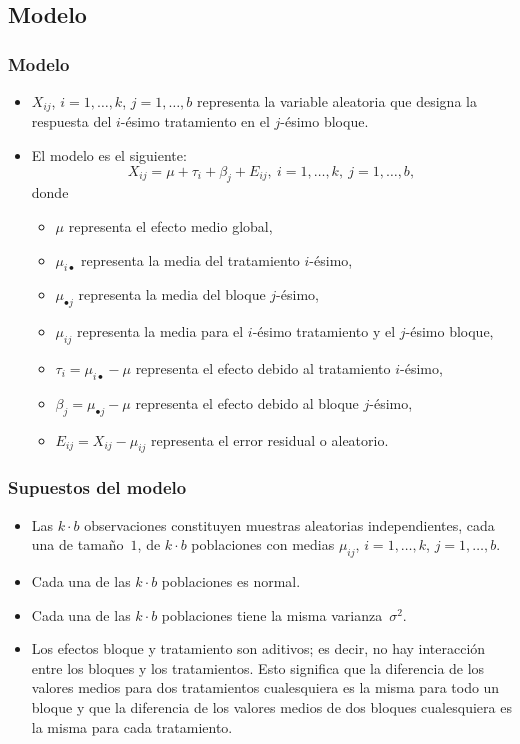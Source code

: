 \subsection{Modelo}
\begin{frame}
\frametitle{Modelo}
\begin{itemize}
\item<2-> $X_{ij}$, $i=1,\ldots,k$, $j=1,\ldots,b$ representa la variable aleatoria que designa la respuesta del $i$-ésimo tratamiento en el $j$-ésimo bloque. 
\item<3-> El modelo es el siguiente:
\[
X_{ij}=\mu + \tau_i + \beta_j + E_{ij}, \ i=1,\ldots,k,\  j=1,\ldots,b,
\]
donde
\begin{itemize}
\item<4-> $\mu$ representa el efecto medio global,
\item<5-> $\mu_{i\bullet}$ representa la media del tratamiento $i$-ésimo,
\item<6-> $\mu_{\bullet j}$ representa la media del bloque $j$-ésimo,
\item<7-> $\mu_{ij}$ representa la media para el $i$-ésimo tratamiento y el $j$-ésimo bloque,
\item<8-> $\tau_{i}=\mu_{i\bullet}-\mu$ representa el efecto debido al tratamiento $i$-ésimo,
\item<9-> $\beta_j = \mu_{\bullet j}-\mu$ representa el efecto debido al bloque $j$-ésimo,
\item<10-> $E_{ij}=X_{ij}-\mu_{ij}$ representa el error residual o aleatorio.
\end{itemize}
\end{itemize}
\end{frame}
\begin{frame}
\frametitle{Supuestos del modelo}
\begin{itemize}
\item<2-> Las $k\cdot b$ observaciones constituyen muestras aleatorias independientes, cada una de tamaño~$1$, de $k\cdot b$ poblaciones con medias $\mu_{ij}$, $i=1,\ldots,k$, $j=1,\ldots,b$.
\item<3-> Cada una de las $k\cdot b$ poblaciones es normal.
\item<4-> Cada una de las $k\cdot b$  poblaciones tiene la misma varianza~$\sigma^2$.
\item<5-> Los efectos bloque y tratamiento son aditivos; es decir, no hay interacción entre los bloques y los tratamientos. Esto significa que la diferencia de los valores medios para dos tratamientos cualesquiera es la misma para todo un bloque y que la diferencia de los valores medios de dos bloques cualesquiera es la misma para cada tratamiento.
\end{itemize}
\end{frame}

